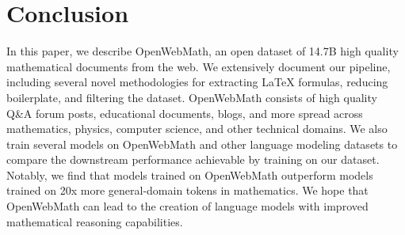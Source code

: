 \section{Conclusion}

In this paper, we describe OpenWebMath, an open dataset of 14.7B high quality mathematical documents from the web. We extensively document our pipeline, including several novel methodologies for extracting \LaTeX{} formulas, reducing boilerplate, and filtering the dataset. OpenWebMath consists of high quality Q\&A forum posts, educational documents, blogs, and more spread across mathematics, physics, computer science, and other technical domains. We also train several models on OpenWebMath and other language modeling datasets to compare the downstream performance achievable by training on our dataset. Notably, we find that models trained on OpenWebMath outperform models trained on 20x more general-domain tokens in mathematics. We hope that OpenWebMath can lead to the creation of language models with improved mathematical reasoning capabilities.